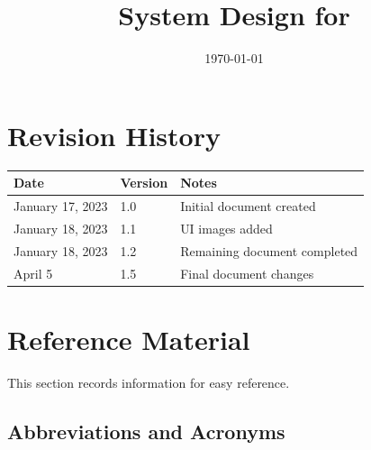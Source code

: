 \documentclass[12pt, titlepage]{article}
\begin{document}
	
	\title{System Design for \progname{}} 
	\author{\authname}
	\date{\today}
	
	\maketitle
	
	
	\section{Revision History}
	
	\begin{tabularx}{\textwidth}{p{3cm}p{2cm}X}
		\toprule {\bf Date} & {\bf Version} & {\bf Notes}\\
		\midrule
		January 17, 2023 & 1.0 & Initial document created\\
		January 18, 2023 & 1.1 & UI images added\\
		January 18, 2023 & 1.2 & Remaining document completed\\
		April 5 & 1.5 & Final document changes \\
		\bottomrule
	\end{tabularx}
	
	\newpage
	
	\section{Reference Material}
	
	This section records information for easy reference.
	
	\subsection{Abbreviations and Acronyms}
	
\end{document}
